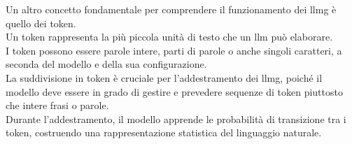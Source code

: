 \noindent Un altro concetto fondamentale per comprendere il funzionamento dei \gls{llmg} è quello dei \gls{token}.\\
Un \gls{token} rappresenta la più piccola unità di testo che un \gls{llm} può elaborare.\\
I \gls{token} possono essere parole intere, parti di parole o anche singoli caratteri, a seconda del modello e della sua configurazione.\\

\noindent La suddivisione in \gls{token} è cruciale per l'addestramento dei \gls{llmg}, poiché il modello deve essere in grado di gestire e prevedere sequenze di \gls{token} piuttosto che intere frasi o parole.\\
Durante l'addestramento, il modello apprende le probabilità di transizione tra i \gls{token}, costruendo una rappresentazione statistica del linguaggio naturale.\\



